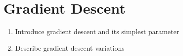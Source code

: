 \section{Gradient Descent}\label{sec:gd}

\begin{enumerate}
	\item Introduce gradient descent and its simplest parameter
	\item Describe gradient descent variations 
\end{enumerate}